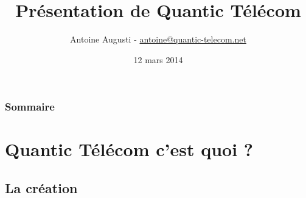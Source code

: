 \documentclass[handout]{beamer}
\title[Quantic]{
	Présentation de Quantic Télécom\\
}
\author{
	Antoine Augusti - \underline{antoine@quantic-telecom.net}
}
\date{12 mars 2014}
\begin{document}
	
	\begin{frame}[plain]
		\titlepage
	\end{frame}

	\begin{frame}[plain]
		\frametitle{Sommaire}
		\tableofcontents
	\end{frame}


	\section{Quantic Télécom c'est quoi ?}

	\subsection{La création}
\end{document}
